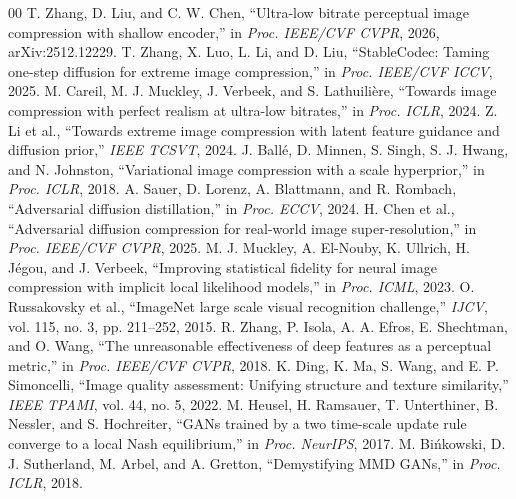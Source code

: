 \documentclass[conference]{IEEEtran}
\begin{document}
\begin{thebibliography}{00}
 T. Zhang, D. Liu, and C. W. Chen, ``Ultra-low bitrate perceptual image
compression with shallow encoder,'' in \emph{Proc. IEEE/CVF CVPR}, 2026, arXiv:2512.12229.
 T. Zhang, X. Luo, L. Li, and D. Liu, ``StableCodec: Taming one-step
diffusion for extreme image compression,'' in \emph{Proc. IEEE/CVF ICCV}, 2025.
 M. Careil, M. J. Muckley, J. Verbeek, and S. Lathuili\`ere, ``Towards image
compression with perfect realism at ultra-low bitrates,'' in \emph{Proc. ICLR}, 2024.
 Z. Li et al., ``Towards extreme image compression with latent feature guidance
and diffusion prior,'' \emph{IEEE TCSVT}, 2024.
 J. Ball\'e, D. Minnen, S. Singh, S. J. Hwang, and N. Johnston, ``Variational
image compression with a scale hyperprior,'' in \emph{Proc. ICLR}, 2018.
 A. Sauer, D. Lorenz, A. Blattmann, and R. Rombach, ``Adversarial diffusion
distillation,'' in \emph{Proc. ECCV}, 2024.
 H. Chen et al., ``Adversarial diffusion compression for real-world image
super-resolution,'' in \emph{Proc. IEEE/CVF CVPR}, 2025.
 M. J. Muckley, A. El-Nouby, K. Ullrich, H. J\'egou, and J. Verbeek, ``Improving
statistical fidelity for neural image compression with implicit local likelihood models,'' in
\emph{Proc. ICML}, 2023.
 O. Russakovsky et al., ``ImageNet large scale visual recognition challenge,''
\emph{IJCV}, vol. 115, no. 3, pp. 211--252, 2015.
 R. Zhang, P. Isola, A. A. Efros, E. Shechtman, and O. Wang, ``The unreasonable
effectiveness of deep features as a perceptual metric,'' in \emph{Proc. IEEE/CVF CVPR}, 2018.
 K. Ding, K. Ma, S. Wang, and E. P. Simoncelli, ``Image quality assessment:
Unifying structure and texture similarity,'' \emph{IEEE TPAMI}, vol. 44, no. 5, 2022.
 M. Heusel, H. Ramsauer, T. Unterthiner, B. Nessler, and S. Hochreiter, ``GANs
trained by a two time-scale update rule converge to a local Nash equilibrium,'' in \emph{Proc.
NeurIPS}, 2017.
 M. Bi\'nkowski, D. J. Sutherland, M. Arbel, and A. Gretton, ``Demystifying MMD
GANs,'' in \emph{Proc. ICLR}, 2018.
\end{thebibliography}
\end{document}
